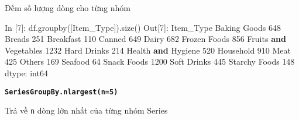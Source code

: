 \documentclass[
]{book}
\newenvironment{Shaded}{\begin{snugshade}}{\end{snugshade}}
\newcommand{\DecValTok}[1]{\textcolor[rgb]{0.00,0.00,0.81}{#1}}
\newcommand{\KeywordTok}[1]{\textcolor[rgb]{0.13,0.29,0.53}{\textbf{#1}}}
\newcommand{\NormalTok}[1]{#1}
\newcommand{\StringTok}[1]{\textcolor[rgb]{0.31,0.60,0.02}{#1}}
\begin{document}
Đếm số lượng dòng cho từng nhóm

\begin{Shaded}
\begin{Highlighting}[]
\NormalTok{In [}\DecValTok{7}\NormalTok{]: df.groupby([}\StringTok{\textquotesingle{}Item\_Type\textquotesingle{}}\NormalTok{]).size()}
\NormalTok{Out[}\DecValTok{7}\NormalTok{]:}
\NormalTok{Item\_Type}
\NormalTok{Baking Goods              }\DecValTok{648}
\NormalTok{Breads                    }\DecValTok{251}
\NormalTok{Breakfast                 }\DecValTok{110}
\NormalTok{Canned                    }\DecValTok{649}
\NormalTok{Dairy                     }\DecValTok{682}
\NormalTok{Frozen Foods              }\DecValTok{856}
\NormalTok{Fruits }\KeywordTok{and}\NormalTok{ Vegetables    }\DecValTok{1232}
\NormalTok{Hard Drinks               }\DecValTok{214}
\NormalTok{Health }\KeywordTok{and}\NormalTok{ Hygiene        }\DecValTok{520}
\NormalTok{Household                 }\DecValTok{910}
\NormalTok{Meat                      }\DecValTok{425}
\NormalTok{Others                    }\DecValTok{169}
\NormalTok{Seafood                    }\DecValTok{64}
\NormalTok{Snack Foods              }\DecValTok{1200}
\NormalTok{Soft Drinks               }\DecValTok{445}
\NormalTok{Starchy Foods             }\DecValTok{148}
\NormalTok{dtype: int64}
\end{Highlighting}
\end{Shaded}

\textbf{\texttt{SeriesGroupBy.nlargest(n=5)}}

Trả về \texttt{n} dòng lớn nhất của từng nhóm Series
\end{document}
